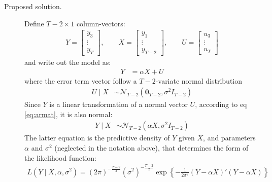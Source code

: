\documentclass[12pt]{article}
\begin{document}
\begin{adjustwidth}{1cm}{1cm}
\begin{description}
\bigskip\item[Proposed solution.] 
Define $T-2\times 1$ column-vectors:
\begin{align}
Y = \begin{bmatrix}y_3 \\ \vdots \\ y_T \end{bmatrix},\qquad X = \begin{bmatrix}y_1 \\ \vdots \\ y_{T-2} \end{bmatrix},\qquad U = \begin{bmatrix}u_3 \\ \vdots \\ u_T \end{bmatrix}
\end{align}
and write out the model as:
\begin{align}
Y &= \alpha X + U \label{eq:armat}
\end{align}
where the error term vector follow a $T-2$-variate normal distribution
\begin{align}
U\mid X &\sim\mathcal{N}_{T-2}\left(\mathbf{0}_{T-2}, \sigma^2 I_{T-2}\right)
\end{align}
Since $Y$ is a linear transformation of a normal vector $U$, according to eq \eqref{eq:armat}, it is also normal:
\begin{align}
Y\mid X &\sim\mathcal{N}_{T-2}\left(\alpha X, \sigma^2 I_{T-2}\right)
\end{align}
The latter equation is the predictive density of $Y$ given $X$, and parameters $\alpha$ and $\sigma^2$ (neglected in the notation above), that determines the form of the likelihood function:
\begin{align}
L\left(Y\mid X, \alpha, \sigma^2\right) = (2\pi)^{-\frac{T-2}{2}}\left(\sigma^2\right)^{-\frac{T-2}{2}}\exp\left\{ -\frac{1}{2\sigma^2}(Y-\alpha X)'(Y-\alpha X)\right\}
\end{align}
\end{description} 



\end{adjustwidth}
\end{document}
